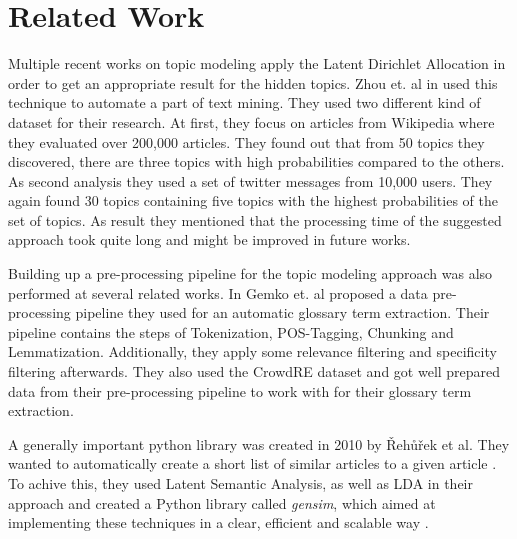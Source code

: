 \section{Related Work} %
\label{sec:related_work}

Multiple recent works on topic modeling apply the Latent Dirichlet Allocation in order to get an appropriate result for the hidden topics. Zhou et. al in \cite{zhou_tong_text_2016} used this technique to automate a part of text mining. They used two different kind of dataset for their research. At first, they focus on articles from Wikipedia where they evaluated over 200,000 articles. They found out that from 50 topics they discovered, there are three topics with high probabilities compared to the others. As second analysis they used a set of twitter messages from 10,000 users. They again found 30 topics containing five topics with the highest probabilities of the set of topics. As result they mentioned that the processing time of the suggested approach took quite long and might be improved in future works.


Building up a pre-processing pipeline for the topic modeling approach was also performed at several related works. In \cite{gemkow_automatic_2018}  Gemko et. al proposed a data pre-processing pipeline they used for an automatic glossary term extraction. Their pipeline contains the steps of Tokenization, POS-Tagging, Chunking and Lemmatization. Additionally, they apply some relevance filtering and specificity filtering afterwards. They also used the CrowdRE dataset and got well prepared data from their pre-processing pipeline to work with for their glossary term extraction.

A generally important python library was created in 2010 by {\v R}eh{\r u}{\v r}ek et al. They wanted to automatically create a short list of similar articles to a given article \cite{rehurek_software_2010}. To achive this, they used Latent Semantic Analysis, as well as LDA in their approach and created a Python library called \emph{gensim}, which aimed at implementing these techniques in a clear, efficient and scalable way \cite{gensim_python}.